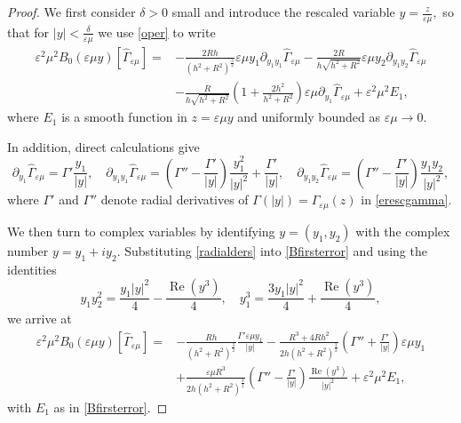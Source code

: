 \documentclass[10pt,a4paper]{amsart}
\newcommand{\ve}{\varepsilon}
\begin{document}
\begin{proof}
We first consider $\delta>0$ small and introduce the rescaled variable $y=\frac{z}{\ve\mu},$ so that for $|y|<\frac {\delta}{\ve\mu}$ we use \eqref{oper} to write
\begin{equation}\label{Bfirsterror}
\begin{aligned}
\ve^2\mu^2 B_{0}(\ve\mu y)[\widehat{\Gamma}_{\ve\mu}]
=& -\frac{2Rh}{(h^2+R^2)^{\frac 3 2}}\ve \mu y_1\partial_{y_1y_1}\widehat{\Gamma}_{\ve\mu}-\frac{2R}{h\sqrt{h^2+R^2}}\ve \mu y_2\partial_{y_1y_2}\widehat{\Gamma}_{\ve\mu}\\
&- \frac{R}{h\sqrt{h^2+R^2}}\left(1+\frac{2h^2}{h^2+R^2}\right)\ve\mu
\partial_{y_1}\widehat{\Gamma}_{\ve\mu}
+\ve^2\mu^2 E_1,
\end{aligned}
\end{equation}
where $E_1$ is a smooth function in $z=\ve \mu y$ and uniformly bounded as  $\ve\mu\to 0$.

In addition, direct calculations give
\begin{equation}\label{radialders}
\partial_{y_1} \widehat\Gamma_{\ve\mu}=\Gamma' \frac{y_1}{|y|},  \quad
\partial_{y_1y_1}\widehat\Gamma_{\ve\mu}
= \left(\Gamma''-\frac{\Gamma'}{|y|}\right)\frac{y_1^2}{|y|^2}+\frac{\Gamma'}{|y|}, \quad \partial_{y_1 y_2}\widehat\Gamma_{\ve\mu}=\left(\Gamma''-\frac{\Gamma'}{|y|}\right)\frac{y_1 y_2}{|y|^2},
\end{equation}
where $\Gamma'$ and $\Gamma''$ denote radial derivatives of $\Gamma(|y|)=\Gamma_{\ve\mu}(z)$ in \eqref{erescgamma}.

We then turn to complex variables by identifying $y=(y_1,y_2)$ with the complex number $y=y_1+iy_2$. Substituting \eqref{radialders} into \eqref{Bfirsterror} and using the identities
\[y_1y_2^2=\frac{y_1|y|^2}{4}-\frac{\operatorname{Re}(y^3)}{4}, \quad y_1^3=\frac{3y_1|y|^2}{4}+\frac{\operatorname{Re}(y^3)}{4},\] 
we arrive at
\begin{equation}\label{bgamma2}
\begin{aligned}
\ve^2\mu^2 B_{0}(\ve\mu y)[\widehat\Gamma_{\ve\mu}]=&-\frac{Rh}{(h^2+R^2)^{\frac{3}{2}}}\frac{\Gamma'\ve\mu y_1}{|y|}-\frac{R^3+4Rh^2}{2h(h^2+R^2)^{\frac{3}{2}}}\left(\Gamma''+\frac{\Gamma'}{|y|}\right)\ve\mu y_1 \\
&+\frac{\ve\mu R^3}{2h(h^2+R^2)^{\frac{3}{2}}}\left(\Gamma''-\frac{\Gamma'}{|y|}\right) \frac{\operatorname{Re}(y^3)}{|y|^2} +\ve^2\mu^2 E_1,
\end{aligned}
\end{equation}
with $E_1$ as in \eqref{Bfirsterror}. 


\end{proof}
\end{document}
